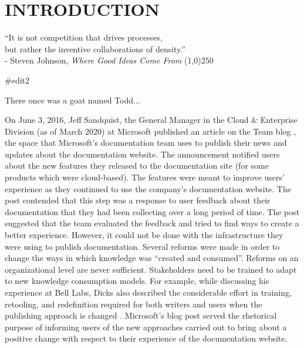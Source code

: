 \chapter{INTRODUCTION}
\label{chap-one}

\begin{flushright}

  ``It is not competition that drives processes,
  \\but rather the inventive collaborations of density.''
  \\- Steven Johnson, \textit{Where Good Ideas Come From}
  \line(1,0){250}
\end{flushright}

#edit2

There once was a goat named Todd...

On June 3, 2016, Jeff Sandquist, the General Manager in the Cloud \& Enterprise Division (as of March 2020) at Microsoft published an article on the Team blog \cite{sandquist}, the space that Microsoft’s documentation team uses to publish their news and updates about the documentation website. The announcement notified users about the new features they released to the documentation site (for some products which were cloud-based). The features were meant to improve users' experience as they continued to use the company’s documentation website. The post contended that this step was a response to user feedback about their documentation that they had been collecting over a long period of time. The post suggested that the team evaluated the feedback and tried to find ways to create a better experience. However, it could not be done with the infrastructure they were using to publish documentation. Several reforms were made in order to change the ways in which knowledge was “created and consumed”. Reforms on an organizational level are never sufficient. Stakeholders need to be trained to adapt to new knowledge consumption models. For example, while discussing his experience at Bell Labs, Dicks also described the considerable effort in training, retooling, and redefinition required for both writers and users when the publishing approach is changed \cite{dicks1994integrating}. Microsoft’s blog post served the rhetorical purpose of informing users of the new approaches carried out to bring about a positive change with respect to their experience of the documentation website.

